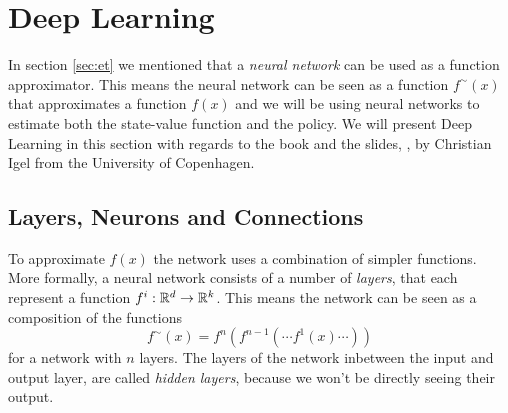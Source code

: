 \documentclass[11pt]{article}
\begin{document}
\maketitle

\section{Deep Learning}\label{sec:deep_learning}

In section \ref{sec:et} we mentioned that
a \textit{neural network} can be used as a function approximator.
This means the neural network can be seen as a function $f^\sim(x)$ that approximates a
function $f(x)$ and we will be using neural networks to estimate
both the state-value function and the policy.
We will present Deep Learning in this section with regards to the book \cite{DeepLearningBook} and the slides, \cite{IgelConv}, by Christian Igel
from the University of Copenhagen.

\subsection{Layers, Neurons and Connections}\label{sec:lnc}

To approximate $f(x)$ the network uses a combination of simpler functions.
More formally, a neural network consists of a number of \textit{layers},
that each represent a function $f^i : \mathbb{R}^{d} \to \mathbb{R}^k$.
This means the network can be seen as a composition of the functions
\begin{equation}\label{eq:layers}
    f^\sim(x) = f^n(f^{n-1}( \cdots f^1(x) \cdots))
\end{equation}
for a network with $n$ layers.
The layers of the network inbetween the input and output layer, are called
\textit{hidden layers}, because we won't be directly seeing their output.
\end{document}
